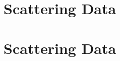 \section{\oEight\ Scattering Data}
%        
%        
%
%        
%        
%
%        
%        
%        

\section{\caForty\ Scattering Data}
\begin{figure}[tb]
    \centering
    \begin{minipage}[t]{0.47\linewidth}
        
    \end{minipage}
    \hfill
    \begin{minipage}[t]{0.47\linewidth}
        
    \end{minipage}
\end{figure}

\begin{figure}[tb]
    \centering
    \begin{minipage}[t]{0.47\linewidth}
        
    \end{minipage}
    \hfill
    \begin{minipage}[t]{0.47\linewidth}
        
    \end{minipage}
\end{figure}

